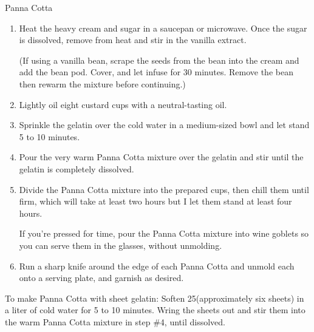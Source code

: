 \begin{recipe}{Panna Cotta}

    \begin{ingredients}
    \end{ingredients}

    \begin{instructions}
        \begin{enumerate}
            \item 
                Heat the heavy cream and sugar in a saucepan or microwave.
                Once the sugar is dissolved, remove from heat and stir in the vanilla extract.
                
                (If using a vanilla bean, scrape the seeds from the bean into the cream and add the bean pod. Cover, and let infuse for 30 minutes.
                Remove the bean then rewarm the mixture before continuing.)
            \item 
                Lightly oil eight custard cups with a neutral-tasting oil.
            \item 
                Sprinkle the gelatin over the cold water in a medium-sized bowl and let stand 5 to 10 minutes.
            \item 
                Pour the very warm Panna Cotta mixture over the gelatin and stir until the gelatin is completely dissolved.
            \item 
                Divide the Panna Cotta mixture into the prepared cups, then chill them until firm, which will take at least two hours but I let them stand at least four hours.

                If you're pressed for time, pour the Panna Cotta mixture into wine goblets so you can serve them in the glasses, without unmolding.
            \item 
                Run a sharp knife around the edge of each Panna Cotta and unmold each onto a serving plate, and garnish as desired.
        \end{enumerate}
        To make Panna Cotta with sheet gelatin: Soften 25\gram (approximately six sheets) in a liter of cold water for 5 to 10 minutes.
        Wring the sheets out and stir them into the warm Panna Cotta mixture in step \#4, until dissolved. 
    \end{instructions}
\end{recipe}
